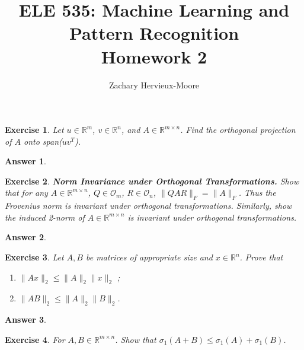 \documentclass[12pt]{article}
\title{ELE 535: Machine Learning and Pattern Recognition \\ Homework 2}
\author{Zachary Hervieux-Moore}
\date{\displaydate{date}}
\theoremstyle{colon}
\newtheorem{exercise}{Exercise}
\newtheorem*{answer}{Answer}
\begin{document}
\maketitle

\clearpage

\begin{exercise}
  Let $u \in \mathbb{R}^m$, $v \in \mathbb{R}^n$, and $A \in \mathbb{R}^{m \times n}$. Find the orthogonal projection of $A$ onto span($u v^T$).
\end{exercise}

\begin{answer}
\end{answer}

\clearpage

\begin{exercise}
  \textbf{Norm Invariance under Orthogonal Transformations.} Show that for any $A \in \mathbb{R}^{m \times n}$, $Q \in \mathcal{O}_m$, $R \in \mathcal{O}_n$, $\lVert QAR \rVert_F = \lVert A \rVert_F$. Thus the Frovenius norm is invariant under orthogonal transformations. Similarly, show the induced 2-norm of $A \in \mathbb{R}^{m \times n}$ is invariant under orthogonal transformations.
\end{exercise}

\begin{answer}
\end{answer}

\clearpage

\begin{exercise}
  Let $A, B$ be matrices of appropriate size and $x \in \mathbb{R}^n$. Prove that

  \begin{enumerate}[label=\alph*)]
    \item $\lVert A x \rVert_2 \leq \lVert A \rVert_2 \lVert x \rVert_2$ ;
    \item $\lVert A B \rVert_2 \leq \lVert A \rVert_2 \lVert B \rVert_2$.
  \end{enumerate}
\end{exercise}

\begin{answer}
\end{answer}

\clearpage

\begin{exercise}
  For $A, B \in \mathbb{R}^{m \times n}$. Show that $\sigma_1 (A + B) \leq \sigma_1 (A) + \sigma_1 (B)$.
\end{exercise}
\end{document}
